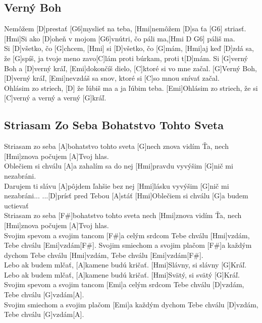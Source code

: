 \documentclass[10pt]{article}
\begin{document}
\begin{Large}
\begin{minipage}{\textwidth}
	\subsection{Verný Boh}
\begin{multicols*}{2}
\begin{guitar}
	[Hmi]Nemôžem [D]prestať [G6]myslieť na teba,
	[Hmi]nemôžem [D]sa ťa [G6] striasť.
	[Hmi]Si ako [D]oheň v mojom [G6]vnútri, 
	čo páli ma,[Hmi D G6] páliš ma.
	\\
	[Hmi] Si [D]všetko, čo [G]chcem,
	[Hmi] si [D]všetko, čo [G]mám,
	[Hmi]aj keď [D]zdá sa, že [G]spíš, 
	ja tvoje meno zavo[C]lám
	proti búrkam, proti t[D]mám.
	\columnbreak
	Si [G]verný Boh a [D]verný kráľ,
	[Emi]dokončíš dielo, [C]ktoré si vo mne začal.
	[G]Verný Boh, [D]verný kráľ, [Emi]nevzdáš sa snov, 
	ktoré si [C]so mnou snívať začal.
	\\
	[G]Ohlásim zo striech,
	[D] že ľúbiš ma a ja ľúbim teba.
	[Emi]Ohlásim zo striech,
	že si [C]verný a verný a verný [G]kráľ.
\end{guitar}
\end{multicols*}
\end{minipage}

\begin{minipage}{\textwidth}
\subsection{Striasam Zo Seba Bohatstvo Tohto Sveta}
\begin{multicols*}{4}
\begin{guitar}
	[D]Striasam zo seba
	[A]bohatstvo tohto sveta
	[G]nech znova vidím Ťa,
	nech [Hmi]znova počujem 
	[A]Tvoj hlas.
	\\
	[D]Oblečiem si chválu
	[A]a zahalím sa do nej
	[Hmi]pravdu vyvýšim
	[G]nič mi nezabráni.
	\\
	[D]Darujem ti slávu
	[A]pôjdem ľahšie bez 
	nej
	[Hmi]lásku vyvýšim
	[G]nič mi nezabráni...
	\columnbreak
	...[D]prísť
	pred Tebou [A]stáť
	[Hmi]Oblečiem si chválu
	[G]a budem uctievať
	\\
	[D]Striasam zo seba
	[F#]bohatstvo tohto sveta
	nech [Hmi]znova vidím Ťa,
	nech [Hmi]znova počujem 
	[A]Tvoj hlas.
	\\
	[D]Svojim spevom 
	a svojim tancom
	[F#]a celým srdcom
	Tebe chválu [Hmi]vzdám,
	Tebe chválu [Emi]vzdám[F#].
	\columnbreak
	[D]Svojim smiechom 
	a svojim plačom
	[F#]a každým dychom
	Tebe chválu [Hmi]vzdám,
	Tebe chválu [Emi]vzdám[F#].
	\\
	[D]Lebo ak budem
	 mlčať,
	[A]kamene budú kričať.
	[Hmi]Slávny, si slávny 
	[G]Kráľ.
	\\
	[D]Lebo ak budem
	mlčať,
	[A]kamene budú kričať.
	[Hmi]Svätý, si svätý [G]Kráľ.
	\columnbreak
	[D]Svojim spevom 
	a svojim tancom
	[Emi]a celým srdcom
	Tebe chválu [D]vzdám,
	Tebe chválu [G]vzdám[A].
	\\
	[D]Svojim smiechom 
	a svojim plačom
	[Emi]a každým dychom
	Tebe chválu [D]vzdám,
	Tebe chválu [G]vzdám[A].
\end{guitar}
\end{multicols*}
\end{minipage}


\end{Large}
\end{document}
